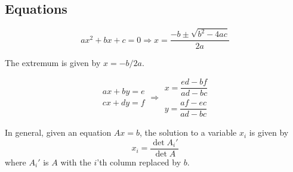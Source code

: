 




    \subsection{Equations}
    \[ax^2+bx+c=0 \Rightarrow x = \frac{-b\pm\sqrt{b^2-4ac}}{2a}\]
    
    The extremum is given by $x = -b/2a$.
    
    \[\begin{aligned}ax+by=e\\cx+dy=f\end{aligned}
    \Rightarrow
    \begin{aligned}x=\dfrac{ed-bf}{ad-bc}\\y=\dfrac{af-ec}{ad-bc}\end{aligned}\]
    
    In general, given an equation $Ax = b$, the solution to a variable $x_i$ is given by
    \[x_i = \frac{\det A_i'}{\det A} \]
    where $A_i'$ is $A$ with the $i$'th column replaced by $b$.
    
